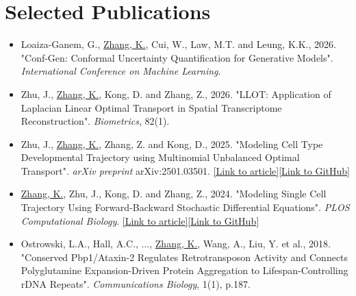 \section{Selected Publications}
\begin{itemize}[leftmargin=*]
\item Loaiza-Ganem, G., \underline{Zhang, K.}, Cui, W., Law, M.T. and Leung, K.K., 2026. "Conf-Gen: Conformal Uncertainty Quantification for Generative Models". \textit{International Conference on Machine Learning}.
\item Zhu, J., \underline{Zhang, K.}, Kong, D. and Zhang, Z., 2026. "LLOT: Application of Laplacian Linear Optimal Transport in Spatial Transcriptome Reconstruction". \textit{Biometrics}, 82(1).
\item Zhu, J., \underline{Zhang, K.}, Zhang, Z. and Kong, D., 2025. "Modeling Cell Type Developmental Trajectory using Multinomial Unbalanced Optimal Transport". \textit{arXiv preprint} arXiv:2501.03501. \href{https://arxiv.org/abs/2501.03501}{[Link to article]}\href{https://github.com/Diebrate/scRNA_study}{[Link to GitHub]}
\item \underline{Zhang, K.}, Zhu, J., Kong, D. and Zhang, Z., 2024. "Modeling Single Cell Trajectory Using Forward-Backward Stochastic Differential Equations". \textit{PLOS Computational Biology}. \href{https://journals.plos.org/ploscompbiol/article?id=10.1371/journal.pcbi.1012015}{[Link to article]}\href{https://github.com/Diebrate/population_model}{[Link to GitHub]}
\item Ostrowski, L.A., Hall, A.C., ..., \underline{Zhang, K.}, Wang, A., Liu, Y. et al., 2018. "Conserved Pbp1/Ataxin-2 Regulates Retrotransposon Activity and Connects Polyglutamine Expansion-Driven Protein Aggregation to Lifespan-Controlling rDNA Repeats". \textit{Communications Biology}, 1(1), p.187.
\end{itemize}
